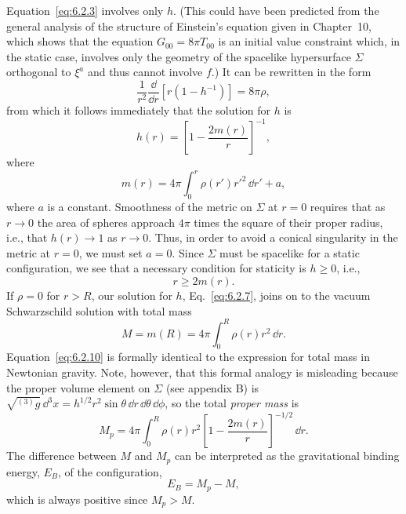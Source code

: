 Equation~\eqref{eq:6.2.3} involves only \(h\). (This could have been predicted
from the general analysis of the structure of Einstein's equation given in
Chapter~10, which shows that the equation \(G_{00}=8\pi T_{00}\) is an initial
value constraint which, in the static case, involves only the geometry of the
spacelike hypersurface \(\Sigma\) orthogonal to \(\xi^a\) and thus cannot involve
\(f\).) It can be rewritten in the form
\begin{equation}
  \frac{1}{r^2}\frac{\dd}{\dd r}\left[r(1-h^{-1})\right]=8\pi\rho,
  \tag{6.2.6}\label{eq:6.2.6}
\end{equation}
from which it follows immediately that the solution for \(h\) is
\begin{equation}
  h(r)=\left[1-\frac{2m(r)}{r}\right]^{-1},
  \tag{6.2.7}\label{eq:6.2.7}
\end{equation}
where
\begin{equation}
  m(r)=4\pi\int_0^r\rho(r')r'^2\,\dd r'+a,
  \tag{6.2.8}\label{eq:6.2.8}
\end{equation}
where \(a\) is a constant. Smoothness of the metric on \(\Sigma\) at \(r=0\)
requires that as \(r\to0\) the area of spheres approach \(4\pi\) times the square
of their proper radius, i.e., that \(h(r)\to1\) as \(r\to0\). Thus, in order to
avoid a conical singularity in the metric at \(r=0\), we must set \(a=0\). Since
\(\Sigma\) must be spacelike for a static configuration, we see that a necessary
condition for staticity is \(h\geq0\), i.e.,
\begin{equation}
  r\geq2m(r).
  \tag{6.2.9}\label{eq:6.2.9}
\end{equation}
If \(\rho=0\) for \(r>R\), our solution for \(h\), Eq.~\eqref{eq:6.2.7}, joins on
to the vacuum Schwarzschild solution with total mass
\begin{equation}
  M=m(R)=4\pi\int_0^R\rho(r)r^2\,\dd r.
  \tag{6.2.10}\label{eq:6.2.10}
\end{equation}
Equation~\eqref{eq:6.2.10} is formally identical to the expression for total
mass in Newtonian gravity. Note, however, that this formal analogy is misleading
because the proper volume element on \(\Sigma\) (see appendix B) is
\(\sqrt{{}^{(3)}g}\,\dd^3x=h^{1/2}r^2\sin\theta\,\dd r\,\dd\theta\,\dd\phi\), so the total
\emph{proper mass} is
\begin{equation}
  M_p=4\pi\int_0^R\rho(r)r^2
  \left[1-\frac{2m(r)}{r}\right]^{-1/2}\,\dd r.
  \tag{6.2.11}\label{eq:6.2.11}
\end{equation}
The difference between \(M\) and \(M_p\) can be interpreted as the gravitational
binding energy, \(E_B\), of the configuration,
\begin{equation}
  E_B=M_p-M,
  \tag{6.2.12}\label{eq:6.2.12}
\end{equation}
which is always positive since \(M_p>M\).

